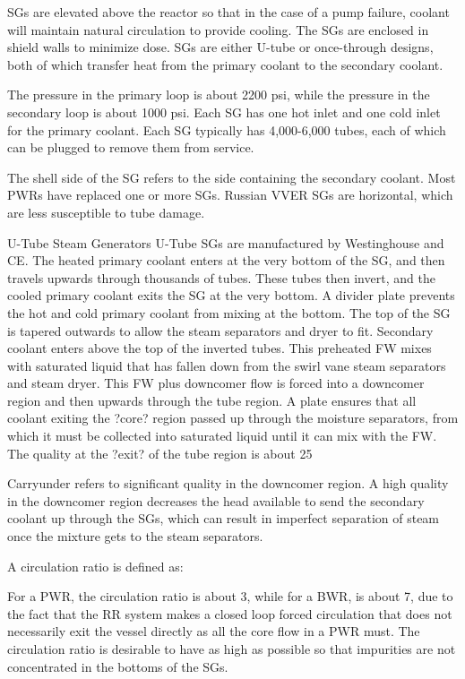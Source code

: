 \documentclass[10pt]{article}
\begin{document}
SGs are elevated above the reactor so that in the case of a pump failure, coolant will maintain natural circulation to provide cooling. The SGs are enclosed in shield walls to minimize dose. SGs are either U-tube or once-through designs, both of which transfer heat from the primary coolant to the secondary coolant. 

The pressure in the primary loop is about 2200 psi, while the pressure in the secondary loop is about 1000 psi. Each SG has one hot inlet and one cold inlet for the primary coolant. Each SG typically has 4,000-6,000 tubes, each of which can be plugged to remove them from service. 

The shell side of the SG refers to the side containing the secondary coolant. Most PWRs have replaced one or more SGs. Russian VVER SGs are horizontal, which are less susceptible to tube damage. 

U-Tube Steam Generators
U-Tube SGs are manufactured by Westinghouse and CE. The heated primary coolant enters at the very bottom of the SG, and then travels upwards through thousands of tubes. These tubes then invert, and the cooled primary coolant exits the SG at the very bottom. A divider plate prevents the hot and cold primary coolant from mixing at the bottom. The top of the SG is tapered outwards to allow the steam separators and dryer to fit. Secondary coolant enters above the top of the inverted tubes. This preheated FW mixes with saturated liquid that has fallen down from the swirl vane steam separators and steam dryer. This FW plus downcomer flow is forced into a downcomer region and then upwards through the tube region. A plate ensures that all coolant exiting the ?core? region passed up through the moisture separators, from which it must be collected into saturated liquid until it can mix with the FW. The quality at the ?exit? of the tube region is about 25%

Carryunder refers to significant quality in the downcomer region. A high quality in the downcomer region decreases the head available to send the secondary coolant up through the SGs, which can result in imperfect separation of steam once the mixture gets to the steam separators. 

A circulation ratio is defined as:


For a PWR, the circulation ratio is about 3, while for a BWR, is about 7, due to the fact that the RR system makes a closed loop forced circulation that does not necessarily exit the vessel directly as all the core flow in a PWR must. The circulation ratio is desirable to have as high as possible so that impurities are not concentrated in the bottoms of the SGs. 
\end{document}
